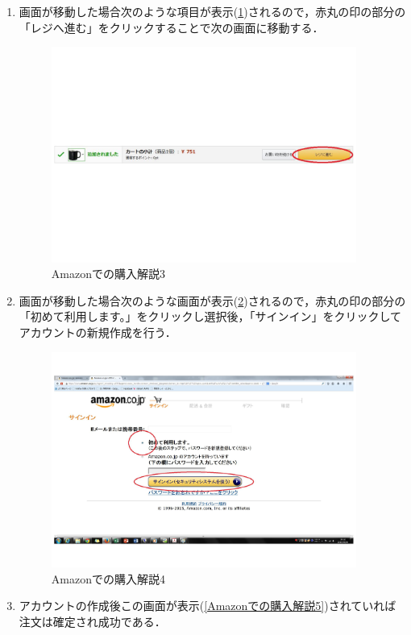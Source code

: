 \begin{enumerate}
 \item 画面が移動した場合次のような項目が表示(\ref{Amazonでの購入解説3})されるので，赤丸の印の部分の「レジへ進む」をクリックすることで次の画面に移動する．

\begin{figure}[htb]
\centering
\includegraphics[width=10cm]{kensakuhouhou3.pdf}
\caption{Amazonでの購入解説3}
\label{Amazonでの購入解説3}
\end{figure}


\clearpage

 \item 画面が移動した場合次のような画面が表示(\ref{Amazonでの購入解説4})されるので，赤丸の印の部分の「初めて利用します。」をクリックし選択後，「サインイン」をクリックしてアカウントの新規作成を行う．


\begin{figure}[htb]
\centering
\includegraphics[width=10cm]{kensakuhouhou4.pdf}
\caption{Amazonでの購入解説4}
\label{Amazonでの購入解説4}
\end{figure}






\item アカウントの作成後この画面が表示(\ref{Amazonでの購入解説5})されていれば注文は確定され成功である．


\end{enumerate}
